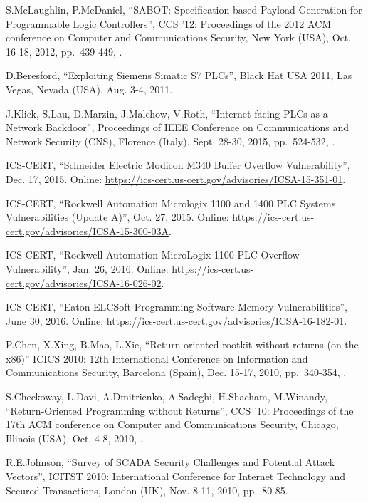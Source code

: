 \begin{thebibliography}{99}
S.McLaughlin, P.McDaniel,
``SABOT: Specification-based Payload Generation for Programmable Logic Controllers'',
CCS '12: Proceedings of the 2012 ACM conference on Computer and Communications Security,
New York (USA), Oct. 16-18, 2012,
pp.\ 439-449,
.

D.Beresford,
``Exploiting Siemens Simatic S7 PLCs'',
Black Hat USA 2011,
Las Vegas, Nevada (USA), Aug. 3-4, 2011.

J.Klick, S.Lau, D.Marzin, J.Malchow, V.Roth,
``Internet-facing PLCs as a Network Backdoor'',
Proceedings of IEEE Conference on Communications and Network Security (CNS),
Florence (Italy), Sept. 28-30, 2015,
pp.\ 524-532,
.

ICS-CERT,
``Schneider Electric Modicon M340 Buffer Overflow Vulnerability'',
Dec. 17, 2015.
Online: \url{https://ics-cert.us-cert.gov/advisories/ICSA-15-351-01}.

ICS-CERT,
``Rockwell Automation Micrologix 1100 and 1400 PLC Systems Vulnerabilities (Update A)'',
Oct. 27, 2015.
Online: \url{https://ics-cert.us-cert.gov/advisories/ICSA-15-300-03A}.

ICS-CERT,
``Rockwell Automation MicroLogix 1100 PLC Overflow Vulnerability'',
Jan. 26, 2016.
Online: \url{https://ics-cert.us-cert.gov/advisories/ICSA-16-026-02}.

ICS-CERT,
``Eaton ELCSoft Programming Software Memory Vulnerabilities'',
June 30, 2016.
Online: \url{https://ics-cert.us-cert.gov/advisories/ICSA-16-182-01}.

P.Chen, X.Xing, B.Mao, L.Xie,
``Return-oriented rootkit without returns (on the x86)''
ICICS 2010: 12th International Conference on Information and Communications Security,
Barcelona (Spain), Dec. 15-17, 2010,
pp.\ 340-354,
.

S.Checkoway, L.Davi, A.Dmitrienko, A.Sadeghi, H.Shacham, M.Winandy,
``Return-Oriented Programming without Returns'',
CCS '10: Proceedings of the 17th ACM conference on Computer and Communications Security,
Chicago, Illinois (USA), Oct. 4-8, 2010,
.

R.E.Johnson,
``Survey of SCADA Security Challenges and Potential Attack Vectors'',
ICITST 2010: International Conference for Internet Technology and Secured Transactions,
London (UK), Nov. 8-11, 2010,
pp.\ 80-85.


\end{thebibliography}
